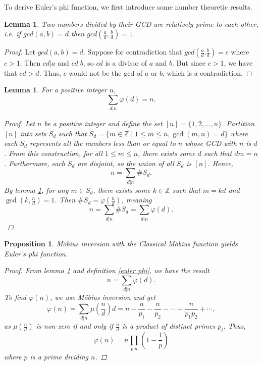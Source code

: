 \documentclass[psamsfonts]{amsart}
\newtheorem{prop}[thm]{Proposition}
\newtheorem{lem}[thm]{Lemma}
\theoremstyle{definition}
\theoremstyle{remark}
\numberwithin{equation}{section}
\begin{document}
To derive Euler's phi function, we first introduce some number theoretic results. 

\begin{lem}\label{divide by GCD}
Two numbers divided by their GCD are relatively prime to each other, i.e. if $gcd(a,b)=d$ then $gcd(\frac{a}{d},\frac{b}{d})=1$.
\end{lem}
\begin{proof}
Let $gcd(a,b)=d$. Suppose for contradiction that $gcd(\frac{a}{d}.\frac{b}{d})=c$ where $c>1$. Then $cd\vert a$ and $cd \vert b$, so $cd$ is a divisor of $a$ and $b$. But since $c>1$, we have that $cd>d$. Thus, $c$ would not be the gcd of $a$ or $b$, which is a contradiction. 
\end{proof}

\begin{lem}\label{phi sum = n}
For a positive integer $n$, 
\begin{equation*}
    \sum_{d\vert n} \varphi(d) = n.
\end{equation*}
\begin{proof}
Let $n$ be a positive integer and define the set $[n]=\{1,2,\dots,n\}$. Partition $[n]$ into sets $S_d$ such that $S_d=\{m\in \mathbb{Z} \mid 1\leq m \leq n, \gcd(m,n)=d\}$ where each $S_d$ represents all the numbers less than or equal to $n$ whose GCD with $n$ is $d$. From this construction, for all $1\leq m \leq n$, there exists some $d$ such that $dm = n$. Furthermore, each $S_d$ are disjoint, so the union of all $S_d$ is $[n]$. Hence,
\[
    n = \sum_{d\vert n} \#S_d.
\]
By lemma \ref{divide by GCD}, for any $m\in S_d$, there exists some $k\in \mathbb{Z}$ such that $m=kd$ and $\gcd(k,\frac{n}{d})=1$. Then $\#S_d=\varphi(\frac{n}{d})$, meaning  
\[
    n = \sum_{d\vert n} \#S_d = \sum_{d\vert n} \varphi(d).
\]
\end{proof}
\end{lem}

\begin{prop}
M\"{o}bius inversion with the Classical M\"{o}bius function yields Euler's phi function. 
\begin{proof}
From lemma \ref{phi sum = n} and definition \ref{euler phi}, we have the result
\[
n=\sum_{d\vert n}\varphi(d).
\]
To find $\varphi(n)$, we use M\"{o}bius inversion and get
\begin{equation}
    \varphi(n)=\sum_{d\vert n}\mu\left(\frac{n}{d}\right)d=n-\frac{n}{p_1}-\frac{n}{p_2}-\cdots + \frac{n}{p_1p_2}+\cdots,
\end{equation}
as $\mu(\frac{n}{d})$ is non-zero if and only if $\frac{n}{d}$ is a product of distinct primes $p_i$. Thus, 
\begin{equation*}
    \varphi(n) = n\prod_{p\vert n}\left(1-\frac{1}{p}\right)
\end{equation*}
where $p$ is a prime dividing $n$.
\end{proof}
\end{prop}
\end{document}
